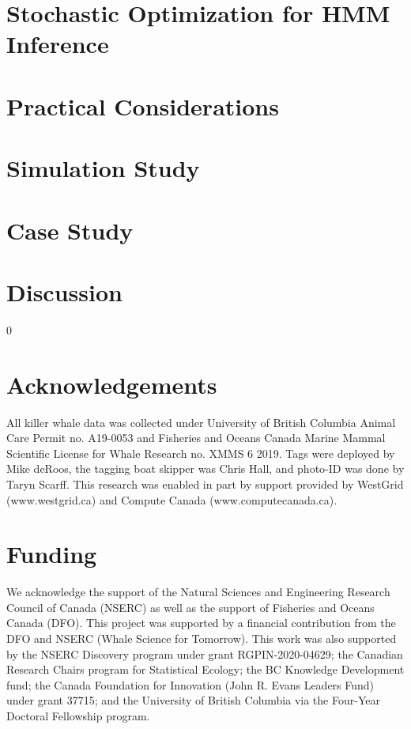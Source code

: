 \documentclass[11pt]{article}
\newcommand{\blind}{0}
\begin{document}
\section{Stochastic Optimization for HMM Inference}


\section{Practical Considerations}

\label{sec:prac}

\section{Simulation Study}


\section{Case Study}


\section{Discussion}


\blind
\section*{Acknowledgements}
All killer whale data was collected under University of British Columbia Animal Care Permit no. A19-0053 and Fisheries and Oceans Canada Marine Mammal Scientific License for Whale Research no. XMMS 6 2019. Tags were deployed by Mike deRoos, the tagging boat skipper was Chris Hall, and photo-ID was done by Taryn Scarff. This research was enabled in part by support provided by WestGrid (www.westgrid.ca) and Compute Canada (www.computecanada.ca). 

\section*{Funding}
We acknowledge the support of the Natural Sciences and Engineering Research Council of Canada (NSERC) as well as the support of Fisheries and Oceans Canada (DFO). This project was supported by a financial contribution from the DFO and NSERC (Whale Science for Tomorrow). This work was also supported by the NSERC Discovery program under grant RGPIN-2020-04629; the Canadian Research Chairs program for Statistical Ecology; the BC Knowledge Development fund; the Canada Foundation for Innovation (John R. Evans Leaders Fund) under grant 37715; and the University of British Columbia via the Four-Year Doctoral Fellowship program.
\end{document}
